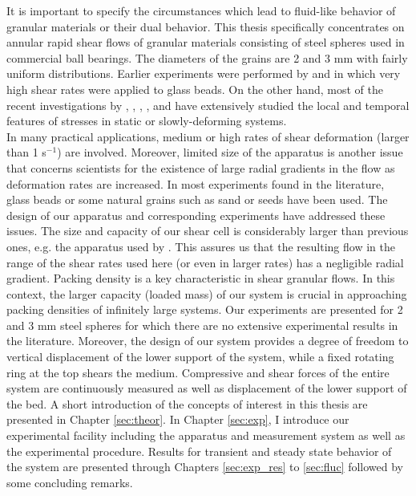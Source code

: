 It is important to specify the circumstances which lead to
fluid-like behavior of granular materials or their dual behavior.
This thesis specifically concentrates on annular rapid shear flows
of granular materials consisting of steel spheres used in
commercial ball bearings. The diameters of the grains are 2 and 3
mm with fairly uniform distributions. Earlier experiments were
performed by \cite{Sav84} and \cite{Han85} in which very high
shear rates were applied to glass beads. On the other hand, most
of the recent investigations by \cite{Mil96}, \cite{Dal01},
\cite{Eri02}, \cite{Mue03}, \cite{Tsa04} and \cite{Dan05} have
extensively studied the local and temporal features of stresses in
static or slowly-deforming systems.\\

In many practical applications, medium or high rates of shear
deformation (larger than 1 s$^{-1}$) are involved. Moreover,
limited size of the apparatus is another issue that concerns
scientists for the existence of large radial gradients in the flow
as deformation rates are increased. In most experiments found in
the literature, glass beads or some natural grains such as sand or
seeds have been used. The design of our apparatus and
corresponding experiments have addressed these issues. The size
and capacity of our shear cell is considerably larger than
previous ones, e.g. the apparatus used by \cite{Han85}. This
assures us that the resulting flow in the range of the shear rates
used here (or even in larger rates) has a negligible radial
gradient. Packing density is a key characteristic in shear
granular flows. In this context, the larger capacity (loaded mass)
of our system is crucial in approaching packing densities of
infinitely large systems. Our experiments are presented for 2 and
3 mm steel spheres for which there are no extensive experimental
results in the literature. Moreover, the design of our system
provides a degree of freedom to vertical displacement of the lower
support of the system, while a fixed rotating ring at the top
shears the medium. Compressive and shear forces of the entire
system are continuously measured as well as displacement of the
lower support of the bed. A short introduction of the concepts of
interest in this thesis are presented in Chapter \ref{sec:theor}.
In Chapter \ref{sec:exp}, I introduce our experimental facility
including the apparatus and measurement system as well as the
experimental procedure. Results for transient and steady state
behavior of the system are presented through Chapters
\ref{sec:exp_res} to \ref{sec:fluc} followed by some concluding remarks.\\
 \pagebreak

